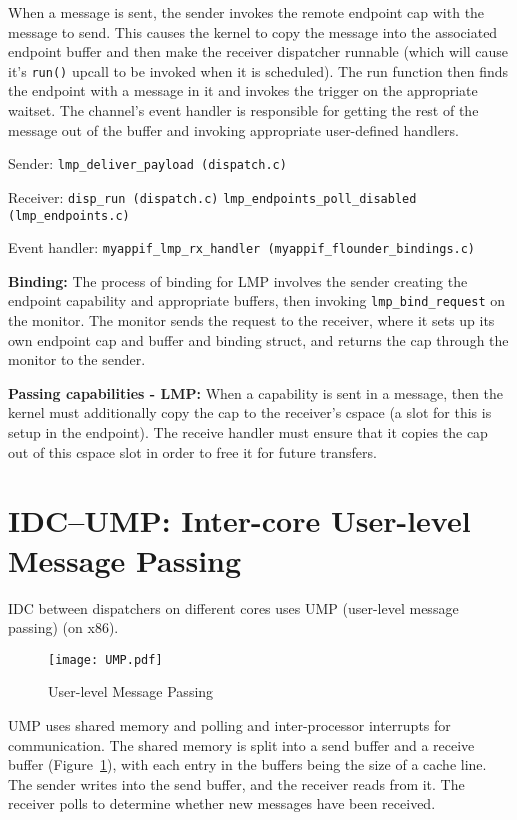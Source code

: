 \documentclass[a4paper,twoside]{report} %
\begin{document}
When a message is sent, the sender invokes the remote endpoint cap with the
message to send. This causes the kernel to copy the message into the associated
endpoint buffer and then make the receiver dispatcher runnable (which will cause
it's \texttt{run()} upcall to be invoked when it is scheduled). The run function
then finds the endpoint with a message in it and invokes the trigger on the
appropriate waitset. The channel's event handler is responsible for getting the
rest of the message out of the buffer and invoking appropriate user-defined
handlers.

Sender: \texttt{lmp\_deliver\_payload (dispatch.c)}

Receiver: \texttt{disp\_run (dispatch.c)}
          \texttt{lmp\_endpoints\_poll\_disabled (lmp\_endpoints.c)}

Event handler: \texttt{myappif\_lmp\_rx\_handler (myappif\_flounder\_bindings.c)}

\textbf{Binding:} The process of binding for LMP involves the sender creating
the endpoint capability and appropriate buffers, then invoking
\texttt{lmp\_bind\_request} on the monitor. The monitor sends the request to the
receiver, where it sets up its own endpoint cap and buffer and binding struct,
and returns the cap through the monitor to the sender.

\textbf{Passing capabilities - LMP:} When a capability is sent in a message, then
the kernel must additionally copy the cap to the receiver's cspace (a slot for
this is setup in the endpoint). The receive handler must ensure that it copies
the cap out of this cspace slot in order to free it for future transfers.

\section{IDC\---UMP: Inter-core User-level Message Passing}

IDC between dispatchers on different cores uses UMP (user-level message passing)
(on x86).

\begin{figure}
  \begin{center}
    \texttt{[image: UMP.pdf]}
  \end{center}
  \caption{User-level Message Passing}
  \label{fig:ump}
\end{figure}

UMP uses shared memory and polling and inter-processor interrupts for
communication. The shared memory is split into a send buffer and a receive
buffer (Figure~\ref{fig:ump}), with each entry in the buffers being the size of
a cache line. The sender writes into the send buffer, and the receiver reads
from it. The receiver polls to determine whether new messages have been
received.
\end{document}
